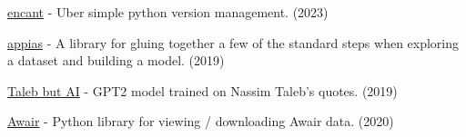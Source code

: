 \begin{cventries}
\vspace{-\baselineskip}

\cventry{}{}{}{}
{
    \begin{cvitems}
    \item \href{https://github.com/aglove2189/encant}{\faLink\acvHeaderIconSep encant}{ - Uber simple python version management. (2023)}
    \item \href{https://github.com/aglove2189/appias}{\faLink\acvHeaderIconSep appias}{ - A library for gluing together a few of the standard steps when exploring a dataset and building a model. (2019)}
    \item \href{https://twitter.com/taleb_gpt2}{\faTwitter\acvHeaderIconSep Taleb but AI}{ - GPT2 model trained on Nassim Taleb's quotes. (2019)}
    \item \href{https://github.com/aglove2189/awair}{\faLink\acvHeaderIconSep Awair}{ - Python library for viewing / downloading Awair data. (2020)}
    \end{cvitems}
}

\end{cventries}